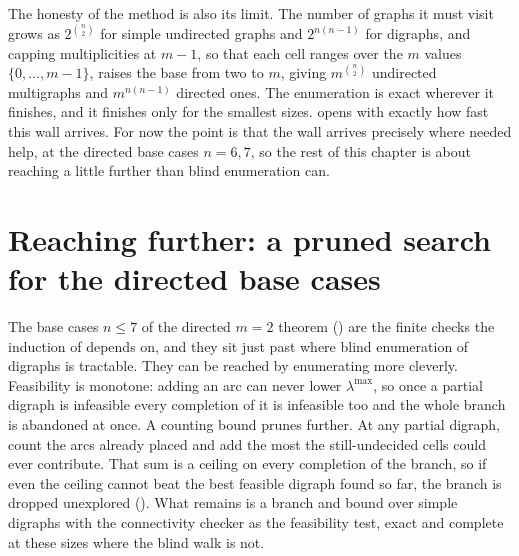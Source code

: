 The honesty of the method is also its limit. The number of graphs it must visit grows as $2^{\binom{n}{2}}$ for simple undirected graphs and $2^{n(n-1)}$ for digraphs, and capping multiplicities at $m-1$, so that each cell ranges over the $m$ values $\{0,\dots,m-1\}$, raises the base from two to $m$, giving $m^{\binom{n}{2}}$ undirected multigraphs and $m^{n(n-1)}$ directed ones. The enumeration is exact wherever it finishes, and it finishes only for the smallest sizes.  opens with exactly how fast this wall arrives. For now the point is that the wall arrives precisely where  needed help, at the directed base cases $n = 6, 7$, so the rest of this chapter is about reaching a little further than blind enumeration can.

\section{Reaching further: a pruned search for the directed base cases}
The base cases $n \le 7$ of the directed $m = 2$ theorem () are the finite checks the induction of  depends on, and they sit just past where blind enumeration of digraphs is tractable. They can be reached by enumerating more cleverly. Feasibility is monotone: adding an arc can never lower $\lambda^{\max}$, so once a partial digraph is infeasible every completion of it is infeasible too and the whole branch is abandoned at once. A counting bound prunes further. At any partial digraph, count the arcs already placed and add the most the still-undecided cells could ever contribute. That sum is a ceiling on every completion of the branch, so if even the ceiling cannot beat the best feasible digraph found so far, the branch is dropped unexplored (). What remains is a branch and bound over simple digraphs with the connectivity checker as the feasibility test, exact and complete at these sizes where the blind walk is not.

